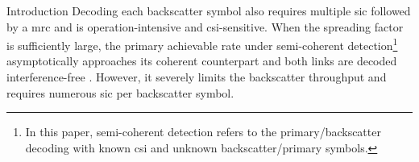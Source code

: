 \documentclass[journal]{IEEEtran}
\begin{document}
\begin{section}{Introduction}
	Decoding each backscatter symbol also requires multiple \gls{sic} followed by a \gls{mrc} and is operation-intensive and \gls{csi}-sensitive.
	When the spreading factor is sufficiently large, the primary achievable rate under semi-coherent detection\footnote{In this paper, semi-coherent detection refers to the primary/backscatter decoding with known \gls{csi} and unknown backscatter/primary symbols.} asymptotically approaches its coherent counterpart and both links are decoded interference-free \cite{Long2020a}.
	However, it severely limits the backscatter throughput and requires numerous \gls{sic} per backscatter symbol.




\end{section}
\end{document}
